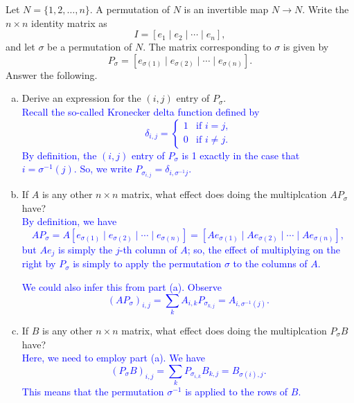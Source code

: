 \documentclass[a4paper,11pt]{article}
\newcommand{\BB}[1]{\textcolor{blue}{#1}}
\begin{document}
 Let $N=\{1,2,\dots,n\}$. A permutation of $N$
is an invertible map $N \rightarrow N$. Write the $n \times n$ identity matrix
as
\[
  I=[e_1 \mid e_2 \mid \cdots \mid e_n],
\]
and let $\sigma$ be a permutation of $N$. The matrix corresponding to $\sigma$
is given by
\[
  P_\sigma = [e_{\sigma(1)} \mid e_{\sigma(2)} \mid \cdots \mid e_{\sigma(n)}].
\]
Answer the following.
\begin{enumerate}[(a)]
\item Derive an expression for the $(i,j)$ entry of $P_\sigma$. \\

  \BB{Recall the so-called Kronecker delta function defined by
    \[
      \delta_{i,j}=\begin{cases}
                     1 & \text{if $i=j$,} \\
                     0 & \text{if $i \neq j$.}
                   \end{cases}
    \]
    By definition, the $(i,j)$ entry of $P_\sigma$ is 1 exactly in the case that
    $i=\sigma^{-1}(j)$. So, we write $P_{\sigma_{i,j}}=\delta_{i,\sigma^{-1}j}$. \\
  }
  
\item If $A$ is any other $n \times n$ matrix, what effect does doing the
  multiplcation $AP_\sigma$ have? \\

  \BB{By definition, we have
    \[
      AP_\sigma = A[e_{\sigma(1)} \mid e_{\sigma(2)} \mid \cdots \mid e_{\sigma(n)}]
      = [Ae_{\sigma(1)} \mid Ae_{\sigma(2)} \mid \cdots \mid Ae_{\sigma(n)}],
    \]
    but $Ae_j$ is simply the $j$-th column of $A$; so, the effect of multiplying
    on the right by $P_\sigma$ is simply to apply the permutation $\sigma$ to
    the columns of $A$.}

  \BB{We could also infer this from part (a). Observe
    \[
      (AP_\sigma)_{i,j} = \sum_kA_{i,k}P_{\sigma_{k,j}} = A_{i,\sigma^{-1}(j)}.
    \]
  }
  
\item If $B$ is any other $n \times n$ matrix, what effect does doing the
  multiplcation $P_\sigma B$ have? \\

  \BB{Here, we need to employ part (a). We have
    \[
      (P_{\sigma}B)_{i,j}=\sum_kP_{\sigma_{i,k}}B_{k,j}=B_{\sigma(i),j}.
    \]
    This means that the permutation $\sigma^{-1}$ is applied to the rows of $B$.\\}
  

\end{enumerate}
\end{document}
